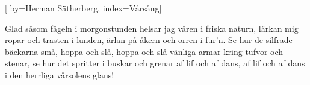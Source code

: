 

[
by={Herman Sätherberg},
index={Vårsång}]

\beginverse* 
Glad såsom fågeln i morgonstunden 
helsar jag våren i friska naturn,
lärkan mig ropar och trasten i lunden, 
ärlan på åkern och orren i fur'n. 
Se hur de silfrade bäckarna små, 
hoppa och slå, hoppa och slå
vänliga armar kring tufvor och stenar,
se hur det spritter i buskar och grenar 
af lif och af dans, af lif och af dans
i den herrliga vårsolens glans!
\endverse
\endsong


